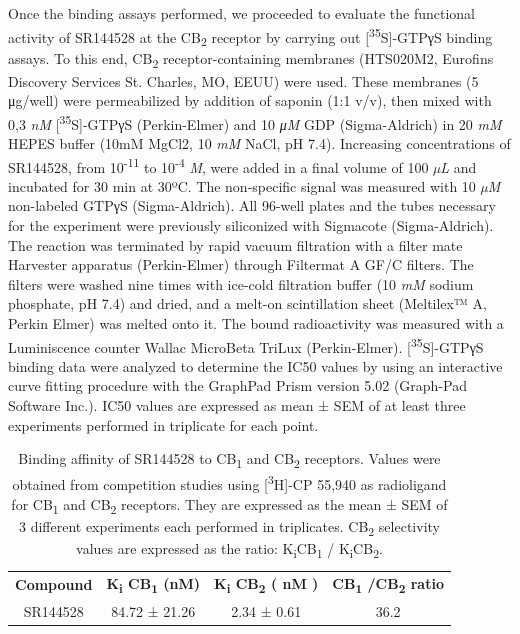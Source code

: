 \documentclass[empirical, authordate]{jote-new-article}
\begin{document}
Once the binding assays performed, we proceeded to evaluate the functional activity of SR144528 at the CB\textsubscript{2} receptor by carrying out [\textsuperscript{35}S]-GTPγS binding assays. To this end, CB\textsubscript{2} receptor-containing membranes (HTS020M2, Eurofins Discovery Services St. Charles, MO, EEUU) were used. These membranes (5 μg/well) were permeabilized by addition of saponin (1:1 v/v), then mixed with 0,3 \emph{nM} [\textsuperscript{35}S]-GTPγS (Perkin-Elmer) and 10 \emph{μM} GDP (Sigma-Aldrich) in 20 \emph{mM} HEPES buffer (10mM MgCl2, 10 \emph{mM} NaCl, pH 7.4). Increasing concentrations of SR144528, from 10\textsuperscript{-11} to 10\textsuperscript{-4} \emph{M}, were added in a final volume of 100 \emph{µL} and incubated for 30 min at 30ºC. The non-specific signal was measured with 10 \emph{µM} non-labeled GTPγS (Sigma-Aldrich). All 96-well plates and the tubes necessary for the experiment were previously siliconized with Sigmacote (Sigma-Aldrich). The reaction was terminated by rapid vacuum filtration with a filter mate Harvester apparatus (Perkin-Elmer) through Filtermat A GF/C filters. The filters were washed nine times with ice-cold filtration buffer (10 \emph{mM} sodium phosphate, pH 7.4) and dried, and a melt-on scintillation sheet (Meltilex™ A, Perkin Elmer) was melted onto it. The bound radioactivity was measured with a Luminiscence counter Wallac MicroBeta TriLux (Perkin-Elmer). [\textsuperscript{35}S]-GTPγS binding data were analyzed to determine the IC50 values by using an interactive curve fitting procedure with the GraphPad Prism version 5.02 (Graph-Pad Software Inc.). IC50 values are expressed as mean ± SEM of at least three experiments performed in triplicate for each point.
\begin{table}

  \begin{fullwidth}
    \caption{Binding affinity of SR144528 to CB\textsubscript{1} and CB\textsubscript{2} receptors. Values were obtained from competition studies using [\textsuperscript{3}H]-CP 55,940 as radioligand for CB\textsubscript{1} and CB\textsubscript{2} receptors. They are expressed as the mean ± SEM of 3 different experiments each performed in triplicates. CB\textsubscript{2 }selectivity values are expressed as the ratio: K\textsubscript{i}CB\textsubscript{1 }/ K\textsubscript{i}CB\textsubscript{2}.
    }
    \label{tab:1}
    \begin{tabular}{c  c  c  c}

      \textbf{Compound} & \textbf{ K\textsubscript{i} CB\textsubscript{1}  (\textbf{nM})} & \textbf{K\textsubscript{i}  CB\textsubscript{2}  ( \textbf{nM}  )} & \textbf{CB\textsubscript{1} /CB\textsubscript{2}  ratio} \\
      SR144528          & 84.72 ± 21.26                                                   & 2.34 ± 0.61                                                        & 36.2                                                     \\
    \end{tabular}
  \end{fullwidth}
\end{table}
\end{document}
